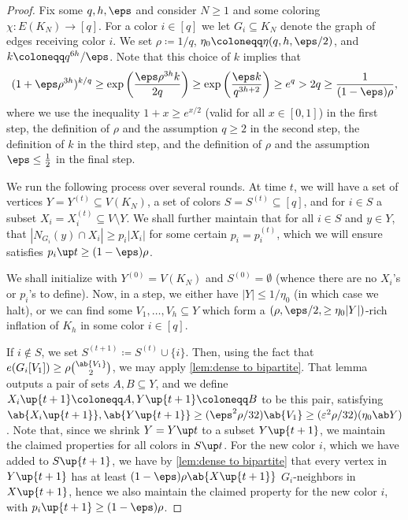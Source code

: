 \begin{proof}


Fix some $q,h,\eps$ and consider $N\ge 1$ and some coloring $\chi:E(K_N)\to [q]$. For a color $i\in [q]$ we let $G_i\subseteq K_N$ denote the graph of edges receiving color $i$. We set $\rho \coloneqq 1/q$, $\eta_0\coloneqq \eta(q,h,\eps/2)$, and $k\coloneqq q^{6h}/\eps$. Note that this choice of $k$ implies that
\begin{equation}\label{eq:k choice}
    (1+\eps \rho^{3h})^{k/q} \geq \exp \left( \frac{\eps \rho^{3h}k}{2q}\right) \geq \exp \left( \frac{\eps k}{q^{3h+2}}\right)\geq e^{q} > 2q \geq \frac{1}{(1-\eps)\rho},
\end{equation}
where we use the inequality $1+x \geq e^{x/2}$ (valid for all $x \in [0,1]$) in the first step, the definition of $\rho$ and the assumption $q \geq 2$ in the second step, the definition of $k$ in the third step, and the definition of $\rho$ and the assumption $\eps \leq \frac 12$ in the final step.

We run the following process over several rounds.
At time $t$, we will have a set of vertices $Y= Y^{(t)} \subseteq V(K_N)$, a set of colors $S= S^{(t)}\subseteq [q]$, and for $i\in S$ a subset $X_i= X^{(t)}_i\subseteq V\setminus Y$. We shall further maintain that for all $i\in S$ and $y\in Y$, that $|N_{G_i}(y)\cap X_i| \ge p_i|X_i|$ for some certain $p_i= p_i^{(t)}$, which we will ensure satisfies $p_i\up t\ge (1-\eps)\rho$. 


We shall initialize with $Y^{(0)} = V(K_N)$ and $S^{(0)} = \emptyset$ (whence there are no $X_i$'s or $p_i$'s to define). Now, in a step, we either have $|Y|\le 1/\eta_0$ (in which case we halt), or we can find some $V_1,\dots,V_{h}\subseteq Y$ which form a $(\rho,\eps/2,\ge \eta_0 |Y|)$-rich inflation of $K_h$ in some color $i\in [q]$. 

If $i \not \in S$, we set $S^{(t+1)} \coloneqq  S^{(t)}\cup \{i\}$. Then, using the fact that $e(G_i[V_1]) \geq \rho \binom{\ab{V_1}}2$, we may apply \cref{lem:dense to bipartite}. That lemma outputs a pair of sets $A,B \subseteq Y$, and we define $X_i \up{t+1}\coloneqq A, Y\up{t+1} \coloneqq B$ to be this pair, satisfying $\ab{X_i\up{t+1}}, \ab{Y\up{t+1}} \geq (\eps^2 \rho/32)\ab{V_1}\geq (\varepsilon^2\rho/32)(\eta_0\ab Y)$. Note that, since we shrink $Y= Y\up t$ to a subset $Y\up{t+1}$, we maintain the claimed properties for all colors in $S\up t$. For the new color $i$, which we have added to $S\up{t+1}$, we have by \cref{lem:dense to bipartite} that every vertex in $Y\up{t+1}$ has at least $(1-\eps)\rho \ab{X\up{t+1}}$ $G_i$-neighbors in $X\up{t+1}$, hence we also maintain the claimed property for the new color $i$, with $p_i\up {t+1} \geq (1-\eps)\rho$.




\end{proof}
